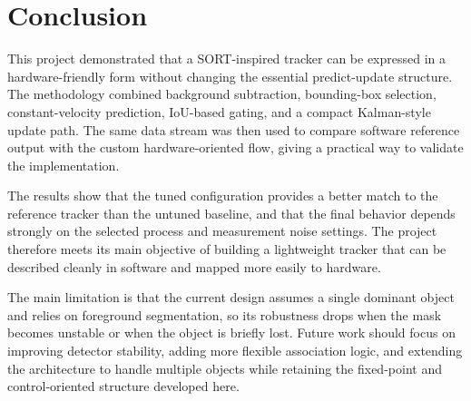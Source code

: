 \chapter{Conclusion}\label{section:conclusions}

This project demonstrated that a SORT-inspired tracker can be expressed in a hardware-friendly 
form without changing the essential predict-update structure. The methodology combined background 
subtraction, bounding-box selection, constant-velocity prediction, IoU-based gating, and a compact 
Kalman-style update path. The same data stream was then used to compare software reference output 
with the custom hardware-oriented flow, giving a practical way to validate the implementation.

The results show that the tuned configuration provides a better match to the reference tracker 
than the untuned baseline, and that the final behavior depends strongly on the selected process 
and measurement noise settings. The project therefore meets its main objective of building a 
lightweight tracker that can be described cleanly in software and mapped more easily to hardware.

The main limitation is that the current design assumes a single dominant object and relies on 
foreground segmentation, so its robustness drops when the mask becomes unstable or when the object 
is briefly lost. Future work should focus on improving detector stability, adding more flexible 
association logic, and extending the architecture to handle multiple objects while retaining the 
fixed-point and control-oriented structure developed here.